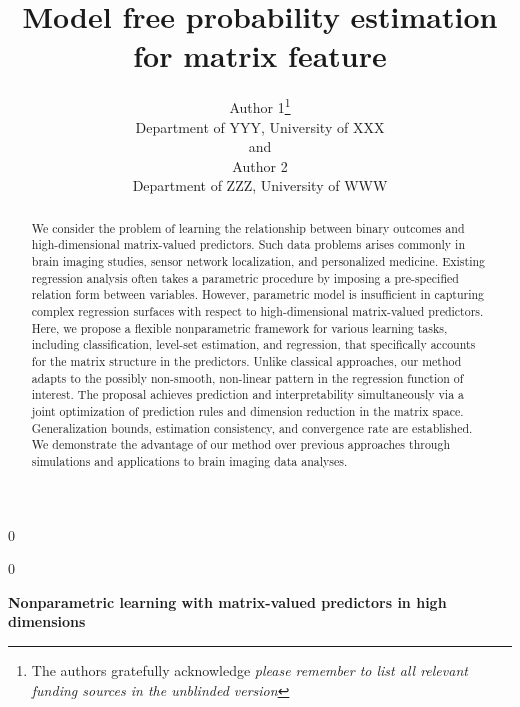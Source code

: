 \documentclass[12pt]{article}
\newcommand{\blind}{0}
\begin{document}
%

\def\spacingset#1{\renewcommand{\baselinestretch}%
{#1}\small\normalsize} \spacingset{1}



\blind
{
  \title{\bf Model free probability estimation for matrix feature}
  \author{Author 1\thanks{
    The authors gratefully acknowledge \textit{please remember to list all relevant funding sources in the unblinded version}}\hspace{.2cm}\\
    Department of YYY, University of XXX\\
    and \\
    Author 2 \\
    Department of ZZZ, University of WWW}
  \maketitle
} \fi

\blind
{
  \bigskip
  \bigskip
  \bigskip
  \begin{center}
    {\LARGE\bf Nonparametric learning with matrix-valued predictors in high dimensions}
\end{center}
  \medskip
} \fi

\bigskip
\begin{abstract}
We consider the problem of learning the relationship between binary outcomes and high-dimensional matrix-valued predictors. Such data problems arises commonly in brain imaging studies, sensor network localization, and personalized medicine. Existing regression analysis often takes a parametric procedure by imposing a pre-specified relation form between variables. However, parametric model is insufficient in capturing complex regression surfaces with respect to high-dimensional matrix-valued predictors. Here, we propose a flexible nonparametric framework for various learning tasks, including classification, level-set estimation, and regression, that specifically accounts for the matrix structure in the predictors. Unlike classical approaches, our method adapts to the possibly non-smooth, non-linear pattern in the regression function of interest. The proposal achieves prediction and interpretability simultaneously via a joint optimization of prediction rules and dimension reduction in the matrix space. Generalization bounds, estimation consistency, and convergence rate are established. We demonstrate the advantage of our method over previous approaches through simulations and applications to brain imaging data analyses. 

\end{abstract}
\end{document}
